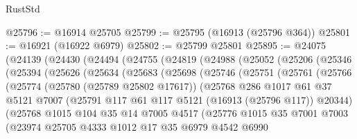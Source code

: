 \begin{lexlean}{RustStd}
\begin{coremodule}
@25796 := @16914 @25705
@25799 := @25795 (@16913 (@25796 @364))
@25801 := @16921 (@16922 @6979)
@25802 := @25799 @25801
@25895 := @24075
    (@24139
      (@24430
        (@24494
          (@24755
            (@24819
              (@24988
                (@25052
                  (@25206
                    (@25346
                      (@25394
                        (@25626
                          (@25634
                            (@25683
                              (@25698
                                (@25746
                                  (@25751
                                    (@25761
                                      (@25766
                                        (@25774
                                          (@25780 (@25789 @25802 @17617))
                                          (@25768
                                            @286
                                            @1017
                                            @61
                                            @37
                                            @5121
                                            @7007
                                            (@25791
                                              @117
                                              @61
                                              @117
                                              @5121
                                              (@16913 (@25796 @117))
                                              @20344)
                                            (@25768
                                              @1015
                                              @104
                                              @35
                                              @14
                                              @7005
                                              @4517
                                              (@25776
                                                @1015
                                                @35
                                                @7001
                                                @7003
                                                (@23974
                                                  @25705
                                                  @4333
                                                  @1012
                                                  @17
                                                  @35
                                                  @6979
                                                  @4542
                                                  @6990

\end{coremodule}
\end{lexlean}
